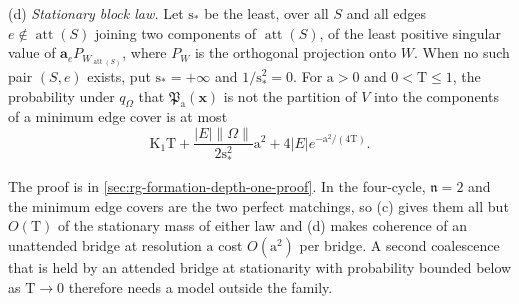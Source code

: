 (d) \emph{Stationary block law.} Let \(\mathrm s_*\) be the least, over all
\(S\) and all edges \(e\notin\operatorname{att}(S)\) joining two components of
\(\operatorname{att}(S)\), of the least positive singular value of
\(\mathbf a_eP_{W_{\operatorname{att}(S)}}\), where \(P_W\) is the orthogonal
projection onto \(W\). When no such pair \((S,e)\) exists, put
\(\mathrm s_*=+\infty\) and \(1/\mathrm s_*^2=0\). For \(\mathrm a>0\) and
\(0<\mathrm T\le1\), the
probability under \(q_\Omega\) that \(\mathfrak P_{\mathrm a}(\mathbf x)\) is
not the partition of \(V\) into the components of a minimum edge cover is at
most
\begin{equation}
\mathrm K_1\mathrm T+\frac{|E|\|\Omega\|}{2\mathrm s_*^2}\mathrm a^2+4|E|e^{-\mathrm a^2/(4\mathrm T)}.
\label{eq:rg-gated-block-law}
\end{equation}

The proof is in \cref{sec:rg-formation-depth-one-proof}. In the four-cycle,
\(\mathfrak n=2\) and the minimum edge covers are the two perfect matchings,
so (c) gives them all but \(O(\mathrm T)\) of the stationary mass of either
law and (d) makes coherence of an unattended bridge at resolution
\(\mathrm a\) cost \(O(\mathrm a^2)\) per bridge. A second coalescence that
is held by an attended bridge at stationarity with probability bounded below
as \(\mathrm T\to0\) therefore needs a model outside the family.

